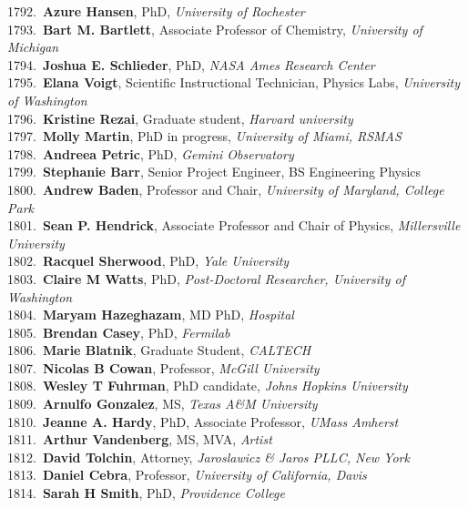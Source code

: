 1792.~{\bf Azure Hansen}, PhD, {\sl University of Rochester} \\
1793.~{\bf Bart M. Bartlett}, Associate Professor of Chemistry, {\sl University of Michigan} \\
1794.~{\bf Joshua E. Schlieder}, PhD, {\sl NASA Ames Research Center} \\
1795.~{\bf Elana Voigt}, Scientific Instructional Technician, Physics Labs, {\sl University of Washington } \\
1796.~{\bf Kristine Rezai}, Graduate student, {\sl Harvard university} \\
1797.~{\bf Molly Martin}, PhD in progress, {\sl University of Miami, RSMAS} \\
1798.~{\bf Andreea Petric}, PhD, {\sl Gemini Observatory} \\
1799.~{\bf Stephanie Barr}, Senior Project Engineer, BS Engineering Physics \\
1800.~{\bf Andrew Baden}, Professor and Chair, {\sl University of Maryland, College Park} \\
1801.~{\bf Sean P. Hendrick}, Associate Professor and Chair of Physics, {\sl Millersville University} \\
1802.~{\bf Racquel Sherwood}, PhD, {\sl Yale University } \\
1803.~{\bf Claire M Watts}, PhD, {\sl Post-Doctoral Researcher, University of Washington} \\
1804.~{\bf Maryam Hazeghazam}, MD PhD, {\sl Hospital} \\
1805.~{\bf Brendan Casey}, PhD, {\sl Fermilab} \\
1806.~{\bf Marie Blatnik}, Graduate Student, {\sl CALTECH} \\
1807.~{\bf Nicolas B Cowan}, Professor, {\sl McGill University} \\
1808.~{\bf Wesley T Fuhrman}, PhD candidate, {\sl Johns Hopkins University} \\
1809.~{\bf Arnulfo Gonzalez}, MS, {\sl Texas A\&M University } \\
1810.~{\bf Jeanne A. Hardy}, PhD, Associate Professor, {\sl UMass Amherst} \\
1811.~{\bf Arthur Vandenberg}, MS, MVA, {\sl Artist} \\
1812.~{\bf David Tolchin}, Attorney, {\sl Jaroslawicz \& Jaros PLLC, New York} \\
1813.~{\bf Daniel Cebra}, Professor, {\sl University of California, Davis} \\
1814.~{\bf Sarah H Smith}, PhD, {\sl Providence College} \\
